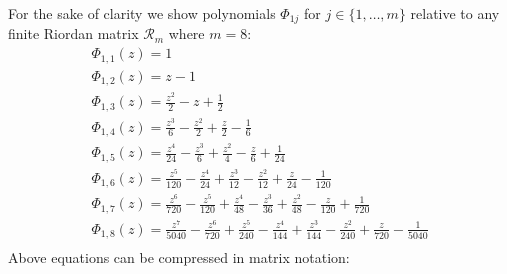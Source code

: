 For the sake of clarity we show polynomials $\Phi_{1j}$ for $j\in \lbrace
1,\ldots,m \rbrace$ relative to any finite Riordan matrix $\mathcal{R}_{m}$
where $m=8$:
\begin{displaymath}
\begin{array}{c}
 \Phi_{ 1, 1 }{\left (z \right )} = 1\\
 \Phi_{ 1, 2 }{\left (z \right )} = z - 1\\
 \Phi_{ 1, 3 }{\left (z \right )} = \frac{z^{2}}{2} - z + \frac{1}{2}\\
 \Phi_{ 1, 4 }{\left (z \right )} = \frac{z^{3}}{6} - \frac{z^{2}}{2} + \frac{z}{2} - \frac{1}{6}\\
 \Phi_{ 1, 5 }{\left (z \right )} = \frac{z^{4}}{24} - \frac{z^{3}}{6} + \frac{z^{2}}{4} - \frac{z}{6} + \frac{1}{24}\\
 \Phi_{ 1, 6 }{\left (z \right )} = \frac{z^{5}}{120} - \frac{z^{4}}{24} + \frac{z^{3}}{12} - \frac{z^{2}}{12} + \frac{z}{24} - \frac{1}{120}\\
 \Phi_{ 1, 7 }{\left (z \right )} = \frac{z^{6}}{720} - \frac{z^{5}}{120} + \frac{z^{4}}{48} - \frac{z^{3}}{36} + \frac{z^{2}}{48} - \frac{z}{120} + \frac{1}{720}\\
 \Phi_{ 1, 8 }{\left (z \right )} = \frac{z^{7}}{5040} - \frac{z^{6}}{720} + \frac{z^{5}}{240} - \frac{z^{4}}{144} + \frac{z^{3}}{144} - \frac{z^{2}}{240} + \frac{z}{720} - \frac{1}{5040}\\
\end{array}
\end{displaymath}
Above equations can be compressed in matrix notation:
